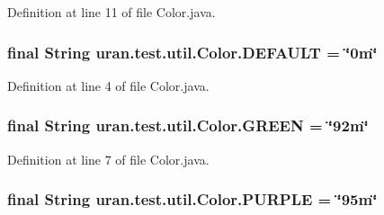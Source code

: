 Definition at line 11 of file Color.\+java.

\hypertarget{classuran_1_1test_1_1util_1_1_color_a0aa0c7ad1c0cae1f92f52617bea0dba4}{}
\subsubsection[{D\+E\+F\+A\+U\+L\+T}]{\setlength{\rightskip}{0pt plus 5cm}final String uran.\+test.\+util.\+Color.\+D\+E\+F\+A\+U\+L\+T = \char`\"{}0m\char`\"{}\hspace{0.3cm}{\ttfamily [static]}}\label{classuran_1_1test_1_1util_1_1_color_a0aa0c7ad1c0cae1f92f52617bea0dba4}


Definition at line 4 of file Color.\+java.

\hypertarget{classuran_1_1test_1_1util_1_1_color_af42bb24cdda43238ac00f6b76d91566c}{}
\subsubsection[{G\+R\+E\+E\+N}]{\setlength{\rightskip}{0pt plus 5cm}final String uran.\+test.\+util.\+Color.\+G\+R\+E\+E\+N = \char`\"{}92m\char`\"{}\hspace{0.3cm}{\ttfamily [static]}}\label{classuran_1_1test_1_1util_1_1_color_af42bb24cdda43238ac00f6b76d91566c}


Definition at line 7 of file Color.\+java.

\hypertarget{classuran_1_1test_1_1util_1_1_color_aa3380d5487a2d1613fee44a3cbdf78e1}{}
\subsubsection[{P\+U\+R\+P\+L\+E}]{\setlength{\rightskip}{0pt plus 5cm}final String uran.\+test.\+util.\+Color.\+P\+U\+R\+P\+L\+E = \char`\"{}95m\char`\"{}\hspace{0.3cm}{\ttfamily [static]}}\label{classuran_1_1test_1_1util_1_1_color_aa3380d5487a2d1613fee44a3cbdf78e1}


